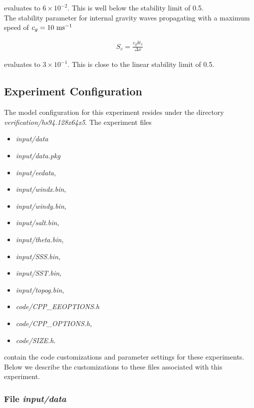 \noindent evaluates to $6 \times 10^{-2}$. This is well below the stability 
limit of 0.5.
\\

\noindent The stability parameter for internal gravity waves propagating
with a maximum speed of $c_{g}=10~{\rm ms}^{-1}$
\cite{adcroft:95}

\begin{eqnarray}
\label{EQ:eg-hs-gfl_stability}
S_{c} = \frac{c_{g} \delta t_{v}}{ \Delta x}
\end{eqnarray}

\noindent evaluates to $3 \times 10^{-1}$. This is close to the linear
stability limit of 0.5.
  
\subsection{Experiment Configuration}
\label{www:tutorials}
\label{SEC:eg-hs_examp_exp_config}

The model configuration for this experiment resides under the 
directory {\it verification/hs94.128x64x5}.  The experiment files 
\begin{itemize}
\item {\it input/data}
\item {\it input/data.pkg}
\item {\it input/eedata},
\item {\it input/windx.bin},
\item {\it input/windy.bin},
\item {\it input/salt.bin},
\item {\it input/theta.bin},
\item {\it input/SSS.bin},
\item {\it input/SST.bin},
\item {\it input/topog.bin},
\item {\it code/CPP\_EEOPTIONS.h}
\item {\it code/CPP\_OPTIONS.h},
\item {\it code/SIZE.h}. 
\end{itemize}
contain the code customizations and parameter settings for these
experiments. Below we describe the customizations
to these files associated with this experiment.

\subsubsection{File {\it input/data}}
\label{www:tutorials}

